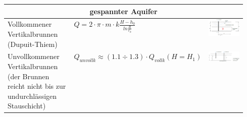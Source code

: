 \begin{minipage}{\linewidth}
\begin{tabular}{p{0.3\linewidth}|l|p{0.25\linewidth}}
			\multicolumn{3}{c|}{ \textbf{gespannter Aquifer} } \\ \hline
			
			Vollkommener Vertikalbrunnen (Dupuit-Thiem) & $ Q = 2 \cdot \pi \cdot m \cdot k \frac{H - h_0}{ln \frac{R}{r_0} } $	& \smallskip \includegraphics[width=0.8\linewidth]{images/GW10gespAquifer.PNG}  \\ \hline
			
			Unvollkommener Vertikalbrunnen (der Brunnen reicht nicht bis zur undurchlässigen Stauschicht)	& $ Q_{unvollk} \approx (1.1 \div 1.3) \cdot Q_{vollk} (H = H_1) $	& \smallskip \includegraphics[width=\linewidth]{images/GW11gespAquiferunvollk.PNG}  \\
						
		\end{tabular}
	\end{minipage}
